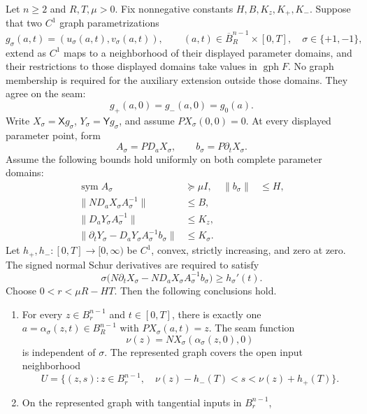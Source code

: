 \begin{theorem}
\label{thm:signed-schur-growth}
Let \(n\ge2\) and \(R,T,\mu>0\).
Fix nonnegative constants \(H,B,K_z,K_+,K_-\).
Suppose that two \(C^1\) graph parametrizations
\[
 g_\sigma(a,t)=(u_\sigma(a,t),v_\sigma(a,t)),
 \qquad (a,t)\in\overline B_R^{n-1}\times[0,T],
 \quad \sigma\in\{+1,-1\},
\]
extend as \(C^1\) maps to a neighborhood of their displayed parameter
domains, and their restrictions to those displayed domains take values in
\(\operatorname{gph}F\).  No graph membership is required for the auxiliary
extension outside those domains.  They agree on the seam:
\[
 g_+(a,0)=g_-(a,0)=g_0(a).
 \tag{S1}\label{eq:schur-seam}
\]
Write \(X_\sigma=\mathsf Xg_\sigma\),
\(Y_\sigma=\mathsf Yg_\sigma\), and assume
\(PX_\sigma(0,0)=0\).  At every displayed parameter point, form
\[
 A_\sigma=P D_aX_\sigma,
 \qquad b_\sigma=P\partial_tX_\sigma.
\]
Assume the following bounds hold uniformly on both complete parameter
domains:
\begin{align}
 \operatorname{sym} A_\sigma&\succeq\mu I,
 &\|b_\sigma\|&\le H,
 \tag{S2}\label{eq:schur-tangent}\\
 \|N D_aX_\sigma A_\sigma^{-1}\|&\le B,
 \tag{S3}\label{eq:schur-normal-tangent}\\
 \|D_aY_\sigma A_\sigma^{-1}\|&\le K_z,
 \tag{S4}\label{eq:schur-output-tangent}\\
 \|\partial_tY_\sigma-
       D_aY_\sigma A_\sigma^{-1}b_\sigma\|&\le K_\sigma.
 \tag{S5}\label{eq:schur-output-normal}
\end{align}
Let \(h_+,h_-:[0,T]\to[0,\infty)\) be \(C^1\), convex, strictly
increasing, and zero at zero.  The signed normal Schur derivatives are
required to satisfy
\[
 \sigma\bigl(N\partial_tX_\sigma-
       ND_aX_\sigma A_\sigma^{-1}b_\sigma\bigr)
       \ge h_\sigma'(t).
 \tag{S6}\label{eq:schur-normal-growth}
\]
Choose \(0<r<\mu R-HT\).  Then the following conclusions hold.
\begin{enumerate}
\item For every \(z\in B_r^{n-1}\) and \(t\in[0,T]\), there is exactly
one \(a=\alpha_\sigma(z,t)\in B_R^{n-1}\) with
\(PX_\sigma(a,t)=z\).  The seam function
\[
 \nu(z)=NX_\sigma(\alpha_\sigma(z,0),0)
\]
is independent of \(\sigma\).  The represented graph covers the open
input neighborhood
\[
 U=\{(z,s):z\in B_r^{n-1},\quad
       \nu(z)-h_-(T)<s<\nu(z)+h_+(T)\}.
 \tag{S7}\label{eq:schur-covered-neighborhood}
\]
\item On the represented graph with tangential inputs in \(B_r^{n-1}\),

\end{enumerate}
\end{theorem}

